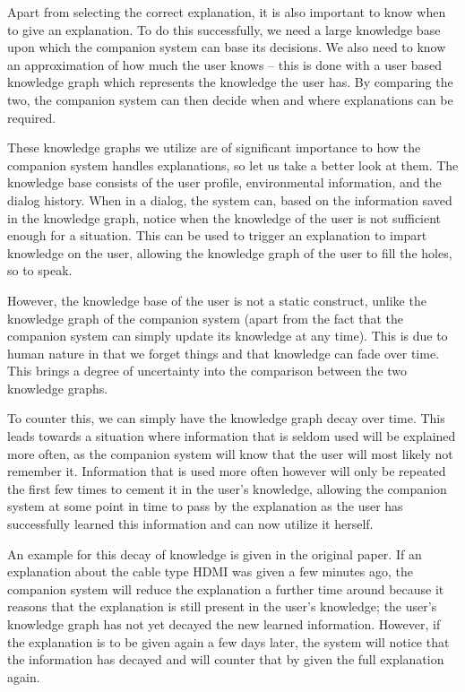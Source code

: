 \documentclass[a4paper]{article}
\begin{document}
Apart from selecting the correct explanation, it is also important to know when to give an explanation. To do this successfully, we need a large knowledge base upon which the companion system can base its decisions. We also need to know an approximation of how much the user knows – this is done with a user based knowledge graph which represents the knowledge the user has. By comparing the two, the companion system can then decide when and where explanations can be required.

These knowledge graphs we utilize are of significant importance to how the companion system handles explanations, so let us take a better look at them. The knowledge base consists of the user profile, environmental information, and the dialog history. When in a dialog, the system can, based on the information saved in the knowledge graph, notice when the knowledge of the user is not sufficient enough for a situation. This can be used to trigger an explanation to impart knowledge on the user, allowing the knowledge graph of the user to fill the holes, so to speak.

However, the knowledge base of the user is not a static construct, unlike the knowledge graph of the companion system (apart from the fact that the companion system can simply update its knowledge at any time). This is due to human nature in that we forget things and that knowledge can fade over time. This brings a degree of uncertainty into the comparison between the two knowledge graphs.

To counter this, we can simply have the knowledge graph decay over time. This leads towards a situation where information that is seldom used will be explained more often, as the companion system will know that the user will most likely not remember it. Information that is used more often however will only be repeated the first few times to cement it in the user's knowledge, allowing the companion system at some point in time to pass by the explanation as the user has successfully learned this information and can now utilize it herself.

An example for this decay of knowledge is given in the original paper. If an explanation about the cable type HDMI was given a few minutes ago, the companion system will reduce the explanation a further time around because it reasons that the explanation is still present in the user's knowledge; the user's knowledge graph has not yet decayed the new learned information. However, if the explanation is to be given again a few days later, the system will notice that the information has decayed and will counter that by given the full explanation again.
\end{document}
